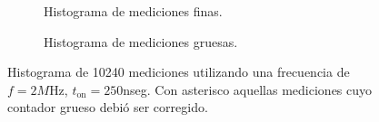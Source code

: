 \begin{figure}[H]
     \centering
     \begin{subfigure}[t]{0.45\textwidth} %
           \centering
           \caption{Histograma de mediciones finas.}
           \label{fig: histograma_66}
     \end{subfigure}%
     \hspace{10pt}%
     \begin{subfigure}[t]{0.4\textwidth} %
           \centering
           \caption{Histograma de mediciones gruesas.}
     \end{subfigure}
     \caption{Histograma de 10240 mediciones utilizando una frecuencia de $f=2M$Hz, $t_{\text{on}}=250$nseg. 
     Con asterisco aquellas mediciones cuyo contador grueso debió ser corregido.}
\end{figure}


